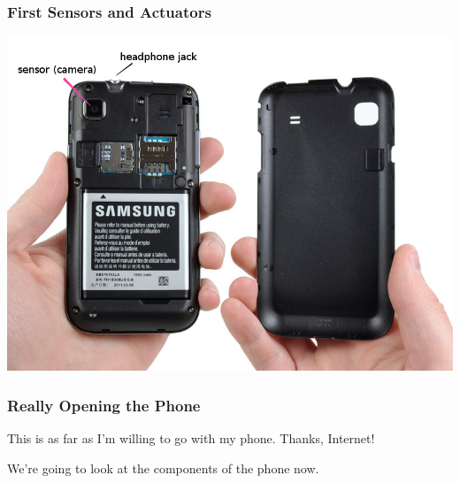 \begin{frame}
\frametitle{First Sensors and Actuators}

\begin{center}
\includegraphics[width=.8\textwidth]{images/GalaxyS4G6-small-annotated.jpg}
\end{center}

\end{frame}

\begin{frame}
\frametitle{Really Opening the Phone}

\vspace*{1em}
This is as far as I'm willing to go with my phone. Thanks, Internet!

\begin{center}
\end{center}

We're going to look at the components of the phone now.

\end{frame}

